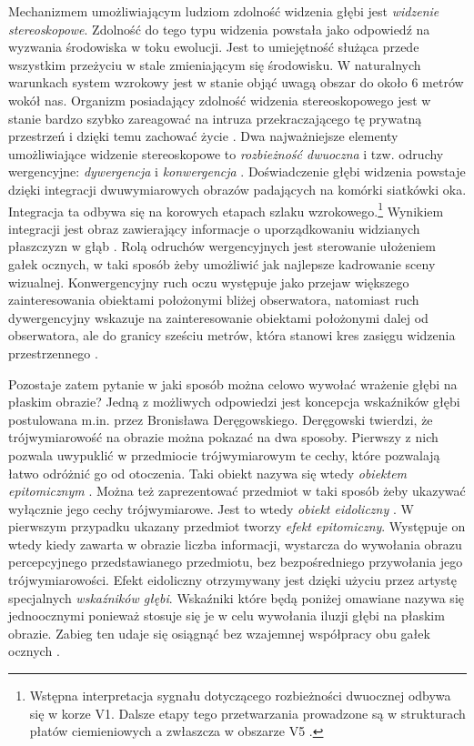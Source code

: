 \documentclass[licencjacka]{kdypl}
\begin{document}
Mechanizmem umożliwiającym ludziom zdolność widzenia głębi jest \textit{widzenie stereoskopowe}. Zdolność do tego typu widzenia powstała jako odpowiedź na wyzwania środowiska w toku ewolucji. Jest to umiejętność służąca przede wszystkim przeżyciu w stale zmieniającym się środowisku. W naturalnych warunkach system wzrokowy jest w stanie objąć uwagą obszar do około 6 metrów wokół nas. Organizm posiadający zdolność widzenia stereoskopowego jest w stanie bardzo szybko zareagować na intruza przekraczającego tę prywatną przestrzeń i dzięki temu zachować życie \citep[s. 221]{Francuz}. Dwa najważniejsze elementy umożliwiające widzenie stereoskopowe to \textit{rozbieżność dwuoczna} i tzw. odruchy wergencyjne: \textit{dywergencja} i \textit{konwergencja} \citep[s. 223]{Francuz}. Doświadczenie głębi widzenia powstaje dzięki integracji dwuwymiarowych obrazów padających na komórki siatkówki oka. Integracja ta odbywa się na korowych etapach szlaku wzrokowego.\footnote{ Wstępna interpretacja sygnału dotyczącego rozbieżności dwuocznej odbywa się  w korze V1. Dalsze etapy tego przetwarzania prowadzone są w strukturach płatów ciemieniowych a zwłaszcza w obszarze V5 \citep[s. 221]{Francuz}.} Wynikiem integracji jest obraz zawierający informacje o uporządkowaniu widzianych płaszczyzn w głąb \citep[s. 222-223]{Francuz}. Rolą odruchów wergencyjnych jest sterowanie ułożeniem gałek ocznych, w taki sposób żeby umożliwić jak najlepsze kadrowanie sceny wizualnej. Konwergencyjny ruch oczu występuje jako przejaw większego zainteresowania obiektami położonymi bliżej obserwatora, natomiast ruch dywergencyjny wskazuje na zainteresowanie obiektami położonymi dalej od obserwatora, ale do granicy sześciu metrów, która stanowi kres zasięgu widzenia przestrzennego \citep[s. 223]{Francuz}.

Pozostaje zatem pytanie w jaki sposób można celowo wywołać wrażenie głębi na płaskim obrazie? Jedną z możliwych odpowiedzi jest koncepcja wskaźników głębi postulowana m.in. przez Bronisława Deręgowskiego. Deręgowski twierdzi, że trójwymiarowość na obrazie można pokazać na dwa sposoby. Pierwszy z nich pozwala uwypuklić w przedmiocie trójwymiarowym te cechy, które pozwalają łatwo odróżnić go od otoczenia. Taki obiekt nazywa się wtedy \textit{obiektem epitomicznym} \citep[s. 20]{Deregowski}. Można też zaprezentować przedmiot w taki sposób żeby ukazywać wyłącznie jego cechy trójwymiarowe. Jest to wtedy \textit{obiekt eidoliczny} \citep[s. 21]{Deregowski}. W pierwszym przypadku ukazany przedmiot tworzy \textit{efekt epitomiczny}. Występuje on wtedy kiedy zawarta w obrazie liczba informacji, wystarcza do wywołania obrazu percepcyjnego przedstawianego przedmiotu, bez bezpośredniego przywołania jego trójwymiarowości. Efekt eidoliczny otrzymywany jest dzięki użyciu przez artystę specjalnych \textit{wskaźników głębi}. Wskaźniki które będą poniżej omawiane nazywa się jednoocznymi ponieważ stosuje się je w celu wywołania iluzji głębi na płaskim obrazie. Zabieg ten udaje się osiągnąć bez wzajemnej współpracy obu gałek ocznych \citep[s. 19-20]{Deregowski}.
\end{document}
